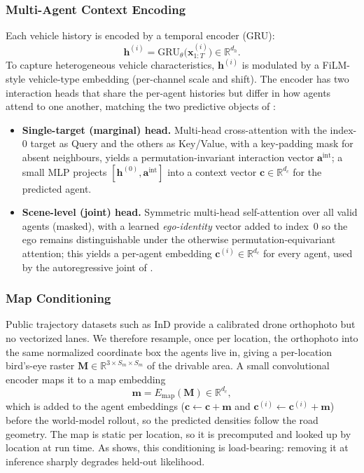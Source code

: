 \documentclass[journal]{IEEEtran}
\begin{document}
\subsubsection{Multi-Agent Context Encoding}\label{sec:context_encoding}
Each vehicle history is encoded by a temporal encoder (GRU):
\begin{equation}
\mathbf{h}^{(i)}=\mathrm{GRU}_{\theta}\big(\mathbf{x}^{(i)}_{1:T}\big)\in\mathbb{R}^{d_h}.
\label{eq:gru_encode}
\end{equation}
To capture heterogeneous vehicle characteristics, $\mathbf{h}^{(i)}$ is modulated by a FiLM-style vehicle-type embedding (per-channel scale and shift). The encoder has two interaction heads that share the per-agent histories but differ in how agents attend to one another, matching the two predictive objects of :
\begin{itemize}
\item \textbf{Single-target (marginal) head.} Multi-head cross-attention with the index-$0$ target as Query and the others as Key/Value, with a key-padding mask for absent neighbours, yields a permutation-invariant interaction vector $\mathbf{a}^{\mathrm{int}}$; a small MLP projects $[\mathbf{h}^{(0)},\mathbf{a}^{\mathrm{int}}]$ into a context vector $\mathbf{c}\in\mathbb{R}^{d_c}$ for the predicted agent.
\item \textbf{Scene-level (joint) head.} Symmetric multi-head self-attention over all valid agents (masked), with a learned \emph{ego-identity} vector added to index~$0$ so the ego remains distinguishable under the otherwise permutation-equivariant attention; this yields a per-agent embedding $\mathbf{c}^{(i)}\in\mathbb{R}^{d_c}$ for every agent, used by the autoregressive joint of .
\end{itemize}

\subsubsection{Map Conditioning}\label{sec:map_conditioning}
Public trajectory datasets such as InD provide a calibrated drone orthophoto but no vectorized lanes. We therefore resample, once per location, the orthophoto into the same normalized coordinate box the agents live in, giving a per-location bird's-eye raster $\mathbf{M}\in\mathbb{R}^{3\times S_m\times S_m}$ of the drivable area. A small convolutional encoder maps it to a map embedding
\begin{equation}
\mathbf{m}=E_{\mathrm{map}}(\mathbf{M})\in\mathbb{R}^{d_c},
\label{eq:map_embed}
\end{equation}
which is added to the agent embeddings ($\mathbf{c}\!\leftarrow\!\mathbf{c}+\mathbf{m}$ and $\mathbf{c}^{(i)}\!\leftarrow\!\mathbf{c}^{(i)}+\mathbf{m}$) before the world-model rollout, so the predicted densities follow the road geometry. The map is static per location, so it is precomputed and looked up by location at run time. As  shows, this conditioning is load-bearing: removing it at inference sharply degrades held-out likelihood.
\end{document}
